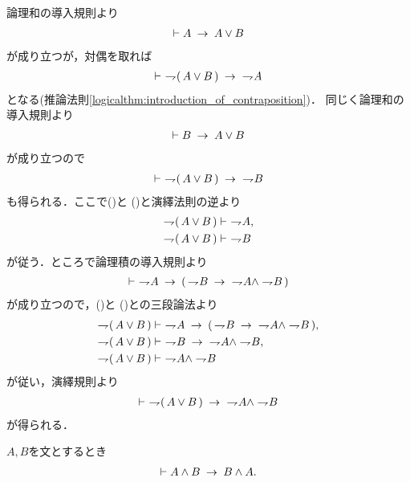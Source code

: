 	\begin{prf}
		論理和の導入規則より
		\begin{align}
			\vdash A \hspace{0.25em}\rightarrow\hspace{0.25em} A \vee B
		\end{align}
		が成り立つが，対偶を取れば
		\begin{align}
			\vdash\ \rightharpoondown\hspace{-0.25em} (\, A \vee B\, ) \hspace{0.25em}\rightarrow\hspace{0.25em}\ \rightharpoondown\hspace{-0.25em} A
			\label{fom:weak_De_Morgan_law_2_1}
		\end{align}
		となる(推論法則\ref{logicalthm:introduction_of_contraposition})．
		同じく論理和の導入規則より
		\begin{align}
			\vdash B \hspace{0.25em}\rightarrow\hspace{0.25em} A \vee B
		\end{align}
		が成り立つので
		\begin{align}
			\vdash\ \rightharpoondown\hspace{-0.25em} (\, A \vee B\, ) \hspace{0.25em}\rightarrow\hspace{0.25em}\ \rightharpoondown\hspace{-0.25em} B
			\label{fom:weak_De_Morgan_law_2_2}
		\end{align}
		も得られる．ここで()と
		()と演繹法則の逆より
		\begin{align}
			\rightharpoondown\hspace{-0.25em} (\, A \vee B\, ) &\vdash\ \rightharpoondown\hspace{-0.25em} A, 
			\label{fom:weak_De_Morgan_law_2_3} \\
			\rightharpoondown\hspace{-0.25em} (\, A \vee B\, ) &\vdash\ \rightharpoondown\hspace{-0.25em} B
			\label{fom:weak_De_Morgan_law_2_4}
		\end{align}
		が従う．ところで論理積の導入規則より
		\begin{align}
			\vdash\ \rightharpoondown\hspace{-0.25em} A \hspace{0.25em}\rightarrow\hspace{0.25em} (\, \rightharpoondown\hspace{-0.25em} B \hspace{0.25em}\rightarrow\hspace{0.25em}\
			\rightharpoondown\hspace{-0.25em} A \wedge \rightharpoondown\hspace{-0.25em} B\, )
		\end{align}
		が成り立つので，()と
		()との三段論法より
		\begin{align}
			\negation (\, A \vee B\, ) &\vdash\ \negation A \rarrow 
				(\, \negation B \rarrow\ \negation A \wedge \negation B\, ), \\
			\negation (\, A \vee B\, ) &\vdash\ 
				\negation B \rarrow\ \negation A \wedge \negation B, \\
			\negation (\, A \vee B\, ) &\vdash\ \negation A \wedge \negation B
		\end{align}
		が従い，演繹規則より
		\begin{align}
			\vdash\ \rightharpoondown\hspace{-0.25em} (\, A \vee B\, ) 
			\hspace{0.25em}\rightarrow\hspace{0.25em}\ \rightharpoondown\hspace{-0.25em} A \wedge \rightharpoondown\hspace{-0.25em} B
		\end{align}
		が得られる．
		\QED
	\end{prf}
	
	\begin{screen}
		\begin{logicalthm}[論理積の可換律]
		\label{logicalthm:commutative_law_of_conjunction}
			$A,B$を文とするとき
			\begin{align}
				\vdash A \wedge B \hspace{0.25em}\rightarrow\hspace{0.25em} B \wedge A.
			\end{align}
		\end{logicalthm}
	\end{screen}
	

